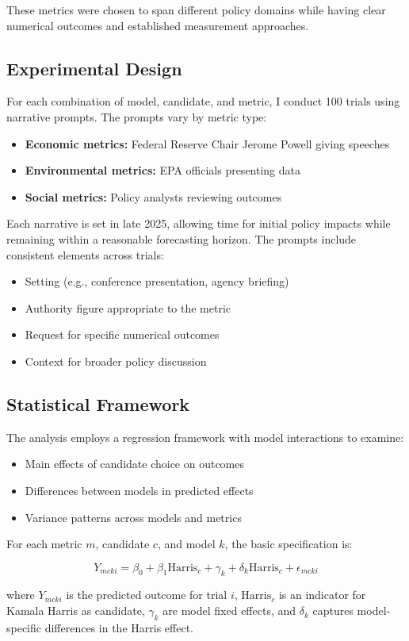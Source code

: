 These metrics were chosen to span different policy domains while having clear numerical outcomes and established measurement approaches.

\subsection{Experimental Design}

For each combination of model, candidate, and metric, I conduct 100 trials using narrative prompts. The prompts vary by metric type:

\begin{itemize}
    \item \textbf{Economic metrics:} Federal Reserve Chair Jerome Powell giving speeches
    \item \textbf{Environmental metrics:} EPA officials presenting data
    \item \textbf{Social metrics:} Policy analysts reviewing outcomes
\end{itemize}

Each narrative is set in late 2025, allowing time for initial policy impacts while remaining within a reasonable forecasting horizon. The prompts include consistent elements across trials:

\begin{itemize}
    \item Setting (e.g., conference presentation, agency briefing)
    \item Authority figure appropriate to the metric
    \item Request for specific numerical outcomes
    \item Context for broader policy discussion
\end{itemize}

\subsection{Statistical Framework}

The analysis employs a regression framework with model interactions to examine:
\begin{itemize}
    \item Main effects of candidate choice on outcomes
    \item Differences between models in predicted effects
    \item Variance patterns across models and metrics
\end{itemize}

For each metric $m$, candidate $c$, and model $k$, the basic specification is:

\begin{equation}
    Y_{mcki} = \beta_0 + \beta_1 \text{Harris}_c + \gamma_k + \delta_k \text{Harris}_c + \epsilon_{mcki}
\end{equation}

where $Y_{mcki}$ is the predicted outcome for trial $i$, $\text{Harris}_c$ is an indicator for Kamala Harris as candidate, $\gamma_k$ are model fixed effects, and $\delta_k$ captures model-specific differences in the Harris effect.
